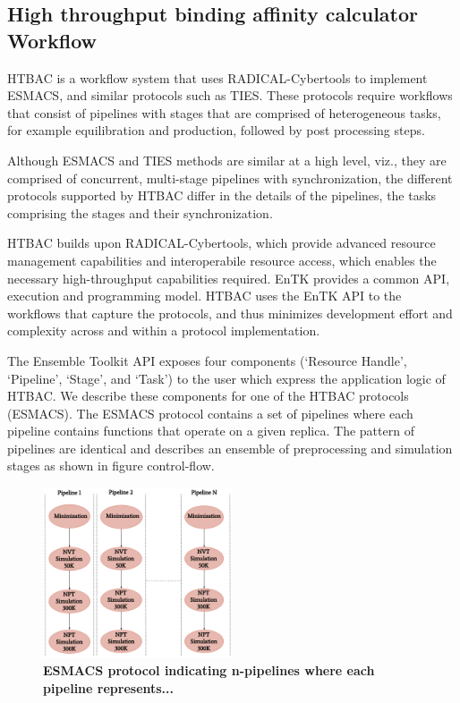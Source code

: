 \subsection{High throughput binding affinity calculator Workflow}

HTBAC is a workflow system that uses RADICAL-Cybertools to implement ESMACS,
and similar protocols such as TIES. These protocols require workflows that
consist of pipelines with stages that are comprised of heterogeneous tasks,
for example equilibration and production, followed by post processing steps.

Although ESMACS and TIES methods are similar at a high level, viz., they are
comprised of concurrent, multi-stage pipelines with synchronization, the
different protocols supported by HTBAC differ in the details of the pipelines,
the tasks comprising the stages and their synchronization.

HTBAC builds upon RADICAL-Cybertools, which provide advanced resource
management capabilities and interoperabile resource access, which enables the
necessary high-throughput capabilities required. EnTK provides a common API,
execution and programming model. HTBAC uses the EnTK API to the workflows that
capture the protocols, and thus minimizes development effort and complexity
across and within a protocol implementation.

The Ensemble Toolkit API exposes four components (‘Resource Handle’,
‘Pipeline’, ‘Stage’, and ‘Task') to the user which express the application
logic of HTBAC. We describe these components for one of the HTBAC protocols
(ESMACS). The ESMACS protocol contains a set of pipelines where each pipeline
contains functions that operate on a given replica. The pattern of pipelines
are identical and describes an ensemble of preprocessing and simulation stages
as shown in figure control-flow.



\begin{figure}[tb]
\centering
  \includegraphics[width=0.5\textwidth]{FIGURES/HT-BAC-NAMD-pipelines-control-flow-only.pdf}
  \caption{\bf ESMACS protocol indicating n-pipelines where each pipeline represents...}
   \label{figure:ESMACS-pipelines}
\end{figure}

